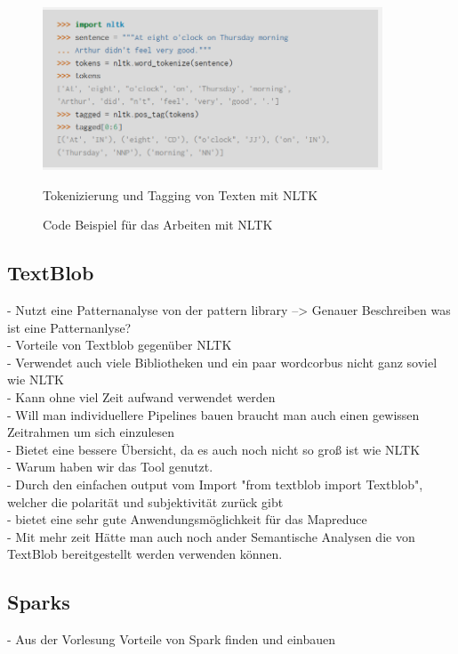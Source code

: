 	\begin{figure}[ht]
		\centering
		\includegraphics[width=0.9\textwidth]{images/Kapitel2/Code_Beispiel_2}
			\caption{\label{fig:CodeBeispiel}Code Beispiel für das Arbeiten mit NLTK}{Tokenizierung und Tagging von Texten mit NLTK}
	\end{figure}    	
		
	
	
	\subsection{TextBlob}
	
	
	- Nutzt eine Patternanalyse von der  pattern library --> Genauer Beschreiben was ist eine Patternanlyse? \\
	- Vorteile von Textblob gegenüber NLTK\\
		- Verwendet auch viele Bibliotheken und ein paar wordcorbus nicht ganz soviel wie NLTK\\ 
		- Kann ohne viel Zeit aufwand verwendet werden\\
		- Will man individuellere Pipelines bauen braucht man auch einen gewissen Zeitrahmen um sich einzulesen\\
		- Bietet eine bessere Übersicht, da es auch noch nicht so groß ist wie NLTK\\
		
	- Warum haben wir das Tool genutzt.	\\
		- Durch den einfachen output vom Import "from textblob import Textblob", welcher die polarität und subjektivität zurück gibt\\
		- bietet eine sehr gute Anwendungsmöglichkeit für das Mapreduce\\
		- Mit mehr zeit Hätte man auch noch ander Semantische Analysen die von TextBlob bereitgestellt werden verwenden können.\\
		

	
	\subsection{Sparks}
	
	- Aus der Vorlesung Vorteile von Spark finden und einbauen	
	


	
